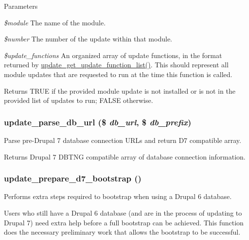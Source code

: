 \begin{DoxyParams}{Parameters}
\item[{\em \$module}]The name of the module. \item[{\em \$number}]The number of the update within that module. \item[{\em \$update\_\-functions}]An organized array of update functions, in the format returned by \hyperlink{update_8inc_ad268e1662e1d06a85f3d51dfec9955b2}{update\_\-get\_\-update\_\-function\_\-list()}. This should represent all module updates that are requested to run at the time this function is called.\end{DoxyParams}
\begin{DoxyReturn}{Returns}
TRUE if the provided module update is not installed or is not in the provided list of updates to run; FALSE otherwise. 
\end{DoxyReturn}
\hypertarget{update_8inc_a39f4938dea0ce704d1e426243cec11ec}{
\subsubsection[{update\_\-parse\_\-db\_\-url}]{\setlength{\rightskip}{0pt plus 5cm}update\_\-parse\_\-db\_\-url (\$ {\em db\_\-url}, \/  \$ {\em db\_\-prefix})}}
\label{update_8inc_a39f4938dea0ce704d1e426243cec11ec}
Parse pre-\/Drupal 7 database connection URLs and return D7 compatible array.

\begin{DoxyReturn}{Returns}
Drupal 7 DBTNG compatible array of database connection information. 
\end{DoxyReturn}
\hypertarget{update_8inc_ae3ce2c866dce2d33c363b57136a2ba84}{
\subsubsection[{update\_\-prepare\_\-d7\_\-bootstrap}]{\setlength{\rightskip}{0pt plus 5cm}update\_\-prepare\_\-d7\_\-bootstrap ()}}
\label{update_8inc_ae3ce2c866dce2d33c363b57136a2ba84}
Performs extra steps required to bootstrap when using a Drupal 6 database.

Users who still have a Drupal 6 database (and are in the process of updating to Drupal 7) need extra help before a full bootstrap can be achieved. This function does the necessary preliminary work that allows the bootstrap to be successful.

